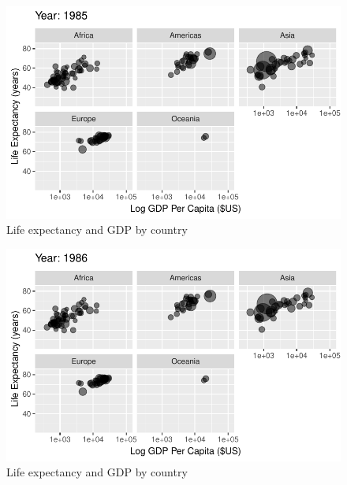 \documentclass[
  letterpaper,
  DIV=11,
  numbers=noendperiod]{scrreport}
\theoremstyle{definition}
\theoremstyle{remark}
\begin{document}
\begin{figure}

{\centering \includegraphics{index_files/figure-pdf/fig-anim-lifegdp-61.pdf}

}

\caption{\label{fig-anim-lifegdp-61}Life expectancy and GDP by country}

\end{figure}

\begin{figure}

{\centering \includegraphics{index_files/figure-pdf/fig-anim-lifegdp-62.pdf}

}

\caption{\label{fig-anim-lifegdp-62}Life expectancy and GDP by country}

\end{figure}
\end{document}
